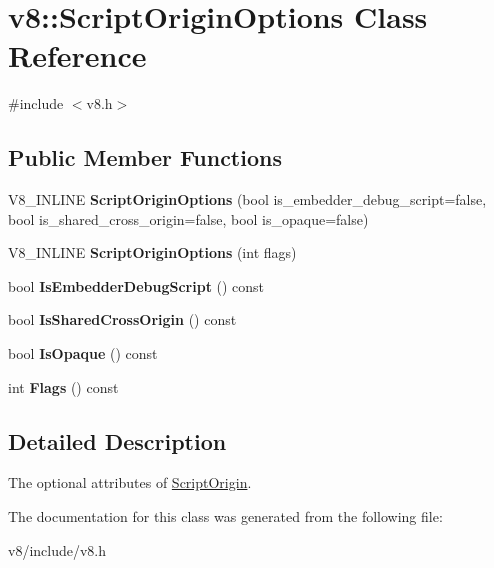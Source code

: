 \hypertarget{classv8_1_1ScriptOriginOptions}{}\section{v8\+:\+:Script\+Origin\+Options Class Reference}
\label{classv8_1_1ScriptOriginOptions}


{\ttfamily \#include $<$v8.\+h$>$}

\subsection*{Public Member Functions}
\begin{DoxyCompactItemize}
\item 
V8\+\_\+\+I\+N\+L\+I\+NE {\bfseries Script\+Origin\+Options} (bool is\+\_\+embedder\+\_\+debug\+\_\+script=false, bool is\+\_\+shared\+\_\+cross\+\_\+origin=false, bool is\+\_\+opaque=false)\hypertarget{classv8_1_1ScriptOriginOptions_a350ff2a0c6b3b0449adefdd920d6808e}{}\label{classv8_1_1ScriptOriginOptions_a350ff2a0c6b3b0449adefdd920d6808e}

\item 
V8\+\_\+\+I\+N\+L\+I\+NE {\bfseries Script\+Origin\+Options} (int flags)\hypertarget{classv8_1_1ScriptOriginOptions_a5c814c5602db2c9ed5c6bc7f05b1d430}{}\label{classv8_1_1ScriptOriginOptions_a5c814c5602db2c9ed5c6bc7f05b1d430}

\item 
bool {\bfseries Is\+Embedder\+Debug\+Script} () const \hypertarget{classv8_1_1ScriptOriginOptions_a4076a3f22dff99a2337ab86d4024ee46}{}\label{classv8_1_1ScriptOriginOptions_a4076a3f22dff99a2337ab86d4024ee46}

\item 
bool {\bfseries Is\+Shared\+Cross\+Origin} () const \hypertarget{classv8_1_1ScriptOriginOptions_a28aa1b32efc3b20b16d65c4176831b4c}{}\label{classv8_1_1ScriptOriginOptions_a28aa1b32efc3b20b16d65c4176831b4c}

\item 
bool {\bfseries Is\+Opaque} () const \hypertarget{classv8_1_1ScriptOriginOptions_ae658f2c06876f86205af4f69804193ab}{}\label{classv8_1_1ScriptOriginOptions_ae658f2c06876f86205af4f69804193ab}

\item 
int {\bfseries Flags} () const \hypertarget{classv8_1_1ScriptOriginOptions_a17e20a214bc8df902419b81c32590efe}{}\label{classv8_1_1ScriptOriginOptions_a17e20a214bc8df902419b81c32590efe}

\end{DoxyCompactItemize}


\subsection{Detailed Description}
The optional attributes of \hyperlink{classv8_1_1ScriptOrigin}{Script\+Origin}. 

The documentation for this class was generated from the following file\+:\begin{DoxyCompactItemize}
\item 
v8/include/v8.\+h\end{DoxyCompactItemize}
